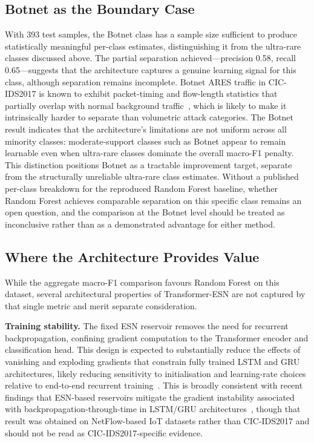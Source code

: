 \documentclass[5p,times]{elsarticle}
\begin{document}
	\subsection{Botnet as the Boundary Case}
	\label{subsec:botnet}
	
	With 393 test samples, the Botnet class has a sample size sufficient to
	produce statistically meaningful per-class estimates, distinguishing
	it from the ultra-rare classes discussed above. The partial separation
	achieved---precision 0.58, recall 0.65---suggests that the architecture
	captures a genuine learning signal for this class, although separation
	remains incomplete. Botnet ARES traffic in CIC-IDS2017 is known to
	exhibit packet-timing and flow-length statistics that partially overlap
	with normal background traffic~\cite{cicids2017}, which is likely to
	make it intrinsically harder to separate than volumetric attack
	categories. The Botnet result indicates that the architecture's
	limitations are not uniform across all minority classes: moderate-support
	classes such as Botnet appear to remain learnable even when ultra-rare
	classes dominate the overall macro-F1 penalty. This distinction
	positions Botnet as a tractable improvement target, separate from the
	structurally unreliable ultra-rare class estimates. Without a published
	per-class breakdown for the reproduced Random Forest baseline, whether
	Random Forest achieves comparable separation on this specific class
	remains an open question, and the comparison at the Botnet level should
	be treated as inconclusive rather than as a demonstrated advantage for
	either method.
	
	\subsection{Where the Architecture Provides Value}
	\label{subsec:value}
	
	While the aggregate macro-F1 comparison favours Random Forest on this
	dataset, several architectural properties of Transformer-ESN are not
	captured by that single metric and merit separate consideration.
	
	\textbf{Training stability.}
	The fixed ESN reservoir removes the need for recurrent backpropagation,
	confining gradient computation to the Transformer encoder and
	classification head. This design is expected to substantially reduce
	the effects of vanishing and exploding gradients that constrain fully
	trained LSTM and GRU architectures, likely reducing sensitivity to
	initialisation and learning-rate choices relative to end-to-end
	recurrent training~\cite{grurnn2018}. This is broadly consistent with
	recent findings that ESN-based reservoirs mitigate the gradient
	instability associated with backpropagation-through-time in LSTM/GRU
	architectures~\cite{alam2026drlesn}, though that result was obtained on
	NetFlow-based IoT datasets rather than CIC-IDS2017 and should not be
	read as CIC-IDS2017-specific evidence.
	
\end{document}
